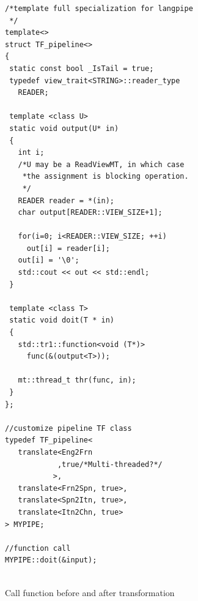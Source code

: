 \documentclass[10pt, conference, compsocconf]{IEEEtran}
\begin{document}
\begin{figure}[!htp]
\begin{minipage}[tb]{\linewidth}
\makebox[\textwidth]{\hrulefill}
\begin{small}
\begin{verbatim}
/*template full specialization for langpipe
 */
template<>
struct TF_pipeline<>
{
 static const bool _IsTail = true;
 typedef view_trait<STRING>::reader_type 
   READER;
  
 template <class U>
 static void output(U* in)
 {
   int i;
   /*U may be a ReadViewMT, in which case
    *the assignment is blocking operation.
    */
   READER reader = *(in);
   char output[READER::VIEW_SIZE+1];

   for(i=0; i<READER::VIEW_SIZE; ++i)
     out[i] = reader[i];
   out[i] = '\0';
   std::cout << out << std::endl;
 }
  
 template <class T>
 static void doit(T * in)
 {
   std::tr1::function<void (T*)> 
     func(&(output<T>));

   mt::thread_t thr(func, in);
 } 
};

//customize pipeline TF class
typedef TF_pipeline<
   translate<Eng2Frn 
            ,true/*Multi-threaded?*/
           >,
   translate<Frn2Spn, true>, 
   translate<Spn2Itn, true>,
   translate<Itn2Chn, true>
> MYPIPE;

//function call
MYPIPE::doit(&input);


\end{verbatim}
\end{small}
\vspace{-1ex}\makebox[\textwidth]{\hrulefill}
\end{minipage}
\caption{Call function before and after transformation}\label{lst:callpipe}
\end{figure}




\end{document}
